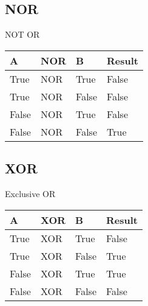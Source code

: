 \documentclass[11pt]{article}
\begin{document}
\subsection{NOR}
NOT OR

\begin{tabular}{lll|l}
A & NOR & B & Result \\
\hline
True & NOR & True & False \\
True & NOR & False & False \\
False & NOR & True & False \\
False & NOR & False & True \\
\hline
\end{tabular}


\subsection{XOR}
Exclusive OR

\begin{tabular}{lll|l}
A & XOR & B & Result \\
\hline
True & XOR & True & False \\
True & XOR & False & True \\
False & XOR & True & True \\
False & XOR & False & False \\
\hline
\end{tabular}






\end{document}
